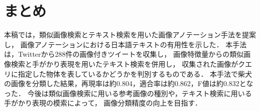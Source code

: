 \chapter{まとめ}
\label{sec:format}
本稿では，類似画像検索とテキスト検索を用いた画像アノテーション手法を提案し，
画像アノテーションにおける日本語テキストの有用性を示した．
本手法は，Twitterから288件の画像付きツイートを収集し，
画像特徴量からの類似画像検索と手がかり表現を用いたテキスト検索を併用し，
収集された画像がクエリに指定した物体を表しているかどうかを判別するものである．
本手法で柴犬の画像を分類した結果，再現率は約0.804，適合率は約0.862，F値は約0.832となった．
今後は類似画像検索に用いる参考画像の種別や，テキスト検索に用いる手がかり表現の模索によって，
画像分類精度の向上を目指す．






